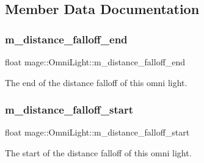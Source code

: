 \subsection{Member Data Documentation}
\hypertarget{classmage_1_1_omni_light_a4ee5cc4103305dc96b43d6286858ef74}{}\label{classmage_1_1_omni_light_a4ee5cc4103305dc96b43d6286858ef74} 
\subsubsection{\texorpdfstring{m\+\_\+distance\+\_\+falloff\+\_\+end}{m\_distance\_falloff\_end}}
{\footnotesize\ttfamily float mage\+::\+Omni\+Light\+::m\+\_\+distance\+\_\+falloff\+\_\+end\hspace{0.3cm}{\ttfamily [private]}}

The end of the distance falloff of this omni light. \hypertarget{classmage_1_1_omni_light_ab784744d39ad3d4f4a7b2214a55108f7}{}\label{classmage_1_1_omni_light_ab784744d39ad3d4f4a7b2214a55108f7} 
\subsubsection{\texorpdfstring{m\+\_\+distance\+\_\+falloff\+\_\+start}{m\_distance\_falloff\_start}}
{\footnotesize\ttfamily float mage\+::\+Omni\+Light\+::m\+\_\+distance\+\_\+falloff\+\_\+start\hspace{0.3cm}{\ttfamily [private]}}

The start of the distance falloff of this omni light. 